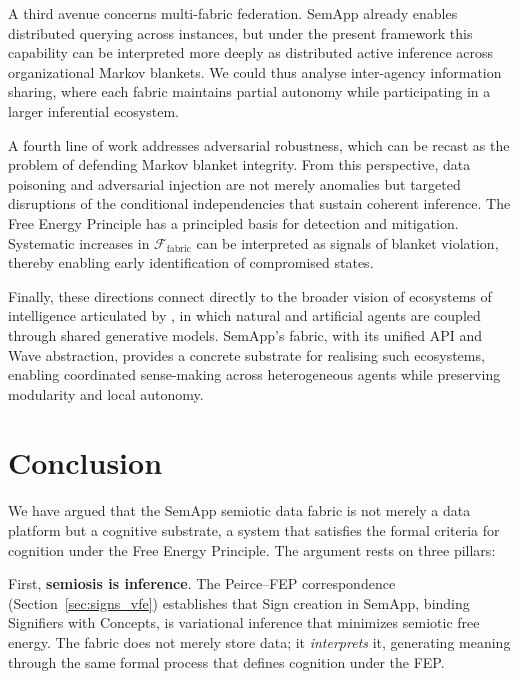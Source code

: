 \documentclass[11pt,a4paper]{article}
\theoremstyle{definition}
\begin{document}
A third avenue concerns multi-fabric federation. SemApp already enables distributed querying across instances, but under the present framework this capability can be interpreted more deeply as distributed active inference across organizational Markov blankets. We could thus analyse inter-agency information sharing, where each fabric maintains partial autonomy while participating in a larger inferential ecosystem.

A fourth line of work addresses adversarial robustness, which can be recast as the problem of defending Markov blanket integrity. From this perspective, data poisoning and adversarial injection are not merely anomalies but targeted disruptions of the conditional independencies that sustain coherent inference. The Free Energy Principle has a principled basis for detection and mitigation. Systematic increases in $\mathcal{F}_{\text{fabric}}$ can be interpreted as signals of blanket violation, thereby enabling early identification of compromised states.

Finally, these directions connect directly to the broader vision of ecosystems of intelligence articulated by \citet{friston2022ecosystems}, in which natural and artificial agents are coupled through shared generative models. SemApp’s fabric, with its unified API and Wave abstraction, provides a concrete substrate for realising such ecosystems, enabling coordinated sense-making across heterogeneous agents while preserving modularity and local autonomy.



\section{Conclusion}
\label{sec:conclusion}

We have argued that the SemApp semiotic data fabric is not merely a data platform but a cognitive substrate, a system that satisfies the formal criteria for cognition under the Free Energy Principle. The argument rests on three pillars:

First, \textbf{semiosis is inference}. The Peirce--FEP correspondence (Section~\ref{sec:signs_vfe}) establishes that Sign creation in SemApp, binding Signifiers with Concepts, is variational inference that minimizes semiotic free energy. The fabric does not merely store data; it \emph{interprets} it, generating meaning through the same formal process that defines cognition under the FEP.
\end{document}
